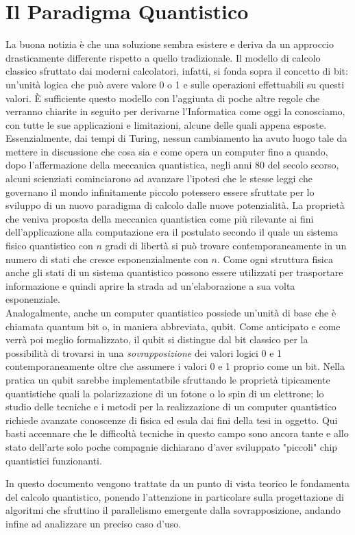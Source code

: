\documentclass[12pt,a4paper,openright]{report}
\begin{document}
\section{Il Paradigma Quantistico}
La buona notizia è che una soluzione sembra esistere e deriva da un approccio drasticamente differente rispetto a quello tradizionale. Il modello di calcolo classico sfruttato dai moderni calcolatori, infatti,
si fonda sopra il concetto di bit: un'unità logica che può avere valore 0 o 1 e sulle operazioni effettuabili su questi valori. È sufficiente questo modello con l'aggiunta di poche altre regole che verranno
chiarite in seguito per derivarne l'Informatica come oggi la conosciamo, con tutte le sue applicazioni e limitazioni, alcune delle quali appena esposte. Essenzialmente, dai tempi di Turing, nessun cambiamento
ha avuto luogo tale da mettere in discussione che cosa sia e come opera un computer fino a quando, dopo l'affermazione della meccanica quantistica, negli anni 80 del secolo scorso, alcuni scienziati
cominciarono ad avanzare l'ipotesi che le stesse leggi che governano il mondo infinitamente piccolo potessero essere sfruttate per lo sviluppo di un nuovo paradigma di calcolo dalle nuove potenzialità.
La proprietà che veniva proposta della meccanica quantistica come più rilevante ai fini dell'applicazione alla computazione era il postulato secondo il quale un sistema fisico quantistico con $n$ gradi di libertà
si può trovare contemporaneamente in un numero di stati che cresce esponenzialmente con $n$. Come ogni struttura fisica anche gli stati di un sistema quantistico possono essere utilizzati per trasportare
informazione e quindi aprire la strada ad un'elaborazione a sua volta esponenziale. \\
Analogalmente, anche un computer quantistico possiede un'unità di base che è chiamata quantum bit o, in maniera abbreviata, qubit. Come anticipato e come verrà poi meglio formalizzato, il qubit si distingue dal bit classico
per la possibilità di trovarsi in una \emph{sovrapposizione} dei valori logici 0 e 1 contemporaneamente oltre che assumere i valori 0 e 1 proprio come un bit. Nella pratica un qubit sarebbe implementatbile 
sfruttando le proprietà tipicamente quantistiche quali la polarizzazione di un fotone o lo spin di un elettrone; lo studio delle tecniche e i metodi per la realizzazione di un computer quantistico richiede
avanzate conoscenze di fisica ed esula dai fini della tesi in oggetto. Qui basti accennare che le difficoltà tecniche in questo campo sono ancora tante e allo stato dell'arte solo poche compagnie dichiarano
d'aver sviluppato "piccoli" chip quantistici funzionanti\cite{ref24}.\par
In questo documento vengono trattate da un punto di vista teorico le fondamenta del calcolo quantistico, ponendo l'attenzione in particolare sulla progettazione di algoritmi che sfruttino il parallelismo 
emergente dalla sovrapposizione, andando infine ad analizzare un preciso caso d'uso.  
\end{document}
